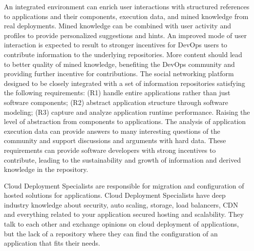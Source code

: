 An integrated environment can enrich user interactions with structured references to applications and their components, execution data, and mined knowledge from real deployments. Mined knowledge can be combined with user activity and profiles to provide personalized suggestions and hints.  An improved mode of user interaction is expected to result to stronger incentives for DevOps users to contribute information to the underlying repositories. More content should lead to better quality of mined knowledge, benefiting the DevOps community and providing further incentive for contributions.  The social networking platform designed to be closely integrated with a set of information repositories satisfying the following requirements: 
(R1) handle entire applications rather than just software components; (R2) abstract application structure through software modeling; (R3) capture and analyze application runtime performance. Raising the level of abstraction from components to applications. The analysis of application execution data can provide answers to many interesting questions of the community and support discussions and arguments with hard data. 
These requirements can provide software developers with strong incentives to contribute, leading to the sustainability and growth of information and derived knowledge in the repository.

Cloud Deployment Specialists are responsible for migration and configuration of hosted solutions for applications. Cloud Deployment Specialists have deep industry knowledge about security, auto scaling, storage, load balancers, CDN and everything related to your application secured hosting and scalability. They talk to each other and exchange opinions on cloud deployment of applications, but the lack of a repository where they can find the configuration of an application that fits their needs. 



